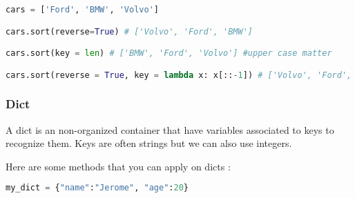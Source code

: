 \documentclass[a4paper, 12pt, titlepage]{scrartcl} %
\begin{document}
\begin{itemize}
\begin{lstlisting}[language=Python]
cars = ['Ford', 'BMW', 'Volvo']

cars.sort(reverse=True) # ['Volvo', 'Ford', 'BMW']

cars.sort(key = len) # ['BMW', 'Ford', 'Volvo'] #upper case matter

cars.sort(reverse = True, key = lambda x: x[::-1]) # ['Volvo', 'Ford', 'BMW']
\end{lstlisting} \vspace{5mm}
\end{itemize}

\subsubsection{Dict}
A dict is an non-organized container that have variables associated to keys to recognize them. Keys are often strings but we can also use integers.

\vspace{5mm}

Here are some methods that you can apply on dicts : 
\begin{lstlisting}[language=Python]
my_dict = {"name":"Jerome", "age":20}
\end{lstlisting} \vspace{5mm}
\end{document}
